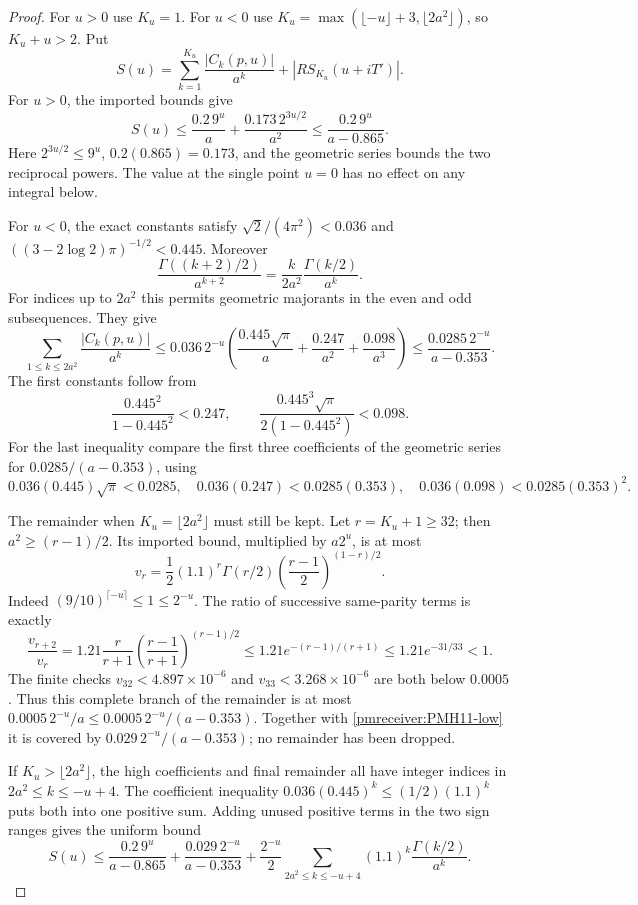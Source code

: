 \begin{proof}
For $u>0$ use $K_u=1$. For $u<0$ use
$K_u=\max(\lfloor-u\rfloor+3,\lfloor2a^2\rfloor)$, so
$K_u+u>2$. Put
\[
 S(u)=\sum_{k=1}^{K_u}\frac{|C_k(p,u)|}{a^k}
            +|RS_{K_u}(u+iT')|.
\]
For $u>0$, the imported bounds give
\[
 S(u)\le\frac{0.2\,9^u}{a}+\frac{0.173\,2^{3u/2}}{a^2}
 \le\frac{0.2\,9^u}{a-0.865}.
\]
Here $2^{3u/2}\le9^u$, $0.2(0.865)=0.173$, and the geometric
series bounds the two reciprocal powers. The value at the single
point $u=0$ has no effect on any integral below.

For $u<0$, the exact constants satisfy
$\sqrt2/(4\pi^2)<0.036$ and
$((3-2\log2)\pi)^{-1/2}<0.445$. Moreover
\[
 \frac{\Gamma((k+2)/2)}{a^{k+2}}
 =\frac{k}{2a^2}\frac{\Gamma(k/2)}{a^k}.
\]
For indices up to $2a^2$ this permits geometric majorants in the
even and odd subsequences. They give
\begin{equation}\label{pmreceiver:PMH11-low}
 \sum_{1\le k\le2a^2}\frac{|C_k(p,u)|}{a^k}
 \le0.036\,2^{-u}
 \left(\frac{0.445\sqrt\pi}{a}+\frac{0.247}{a^2}
                         +\frac{0.098}{a^3}\right)
 \le\frac{0.0285\,2^{-u}}{a-0.353}.
\end{equation}
The first constants follow from
\[
 \frac{0.445^2}{1-0.445^2}<0.247,\qquad
 \frac{0.445^3\sqrt\pi}{2(1-0.445^2)}<0.098.
\]
For the last inequality compare the first three coefficients of
the geometric series for $0.0285/(a-0.353)$, using
\[
 0.036(0.445)\sqrt\pi<0.0285,\quad
 0.036(0.247)<0.0285(0.353),\quad
 0.036(0.098)<0.0285(0.353)^2.
\]

The remainder when $K_u=\lfloor2a^2\rfloor$ must still be kept.
Let $r=K_u+1\ge32$; then $a^2\ge(r-1)/2$. Its imported bound,
multiplied by $a2^u$, is at most
\[
 v_r=\frac12(1.1)^r\Gamma(r/2)
       \left(\frac{r-1}{2}\right)^{(1-r)/2}.
\]
Indeed $(9/10)^{\lceil-u\rceil}\le1\le2^{-u}$.
The ratio of successive same-parity terms is exactly
\[
 \frac{v_{r+2}}{v_r}=1.21\frac r{r+1}
       \left(\frac{r-1}{r+1}\right)^{(r-1)/2}
 \le1.21e^{-(r-1)/(r+1)}\le1.21e^{-31/33}<1.
\]
The finite checks $v_{32}<4.897\times10^{-6}$ and
$v_{33}<3.268\times10^{-6}$ are both below $0.0005$.
Thus this complete branch of the remainder is at most
$0.0005\,2^{-u}/a\le0.0005\,2^{-u}/(a-0.353)$.
Together with \eqref{pmreceiver:PMH11-low} it is covered by
$0.029\,2^{-u}/(a-0.353)$; no remainder has been dropped.

If $K_u>\lfloor2a^2\rfloor$, the high coefficients and final
remainder all have integer indices in $2a^2\le k\le-u+4$.
The coefficient inequality $0.036(0.445)^k\le(1/2)(1.1)^k$
puts both into one positive sum. Adding unused positive terms in
the two sign ranges gives the uniform bound
\begin{equation}\label{pmreceiver:PMH11-S}
 S(u)\le\frac{0.2\,9^u}{a-0.865}+\frac{0.029\,2^{-u}}{a-0.353}
       +\frac{2^{-u}}2
          \sum_{2a^2\le k\le-u+4}(1.1)^k\frac{\Gamma(k/2)}{a^k}.
\end{equation}


\end{proof}

